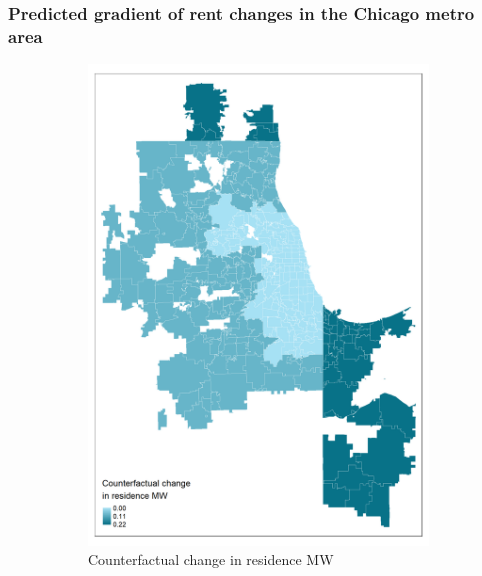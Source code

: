 \documentclass[aspectratio=169, t]{beamer}
\begin{document}
\begin{frame}
	\frametitle{Predicted gradient of rent changes in the Chicago metro area}
	\begin{figure}
		\centering
		\begin{subfigure}{0.33\textwidth}
			\includegraphics[width = 0.99\textwidth]{counterfactuals/output/chicago_d_ln_mw.png}
			\caption*{Counterfactual change in residence MW}
		\end{subfigure}%
		\begin{subfigure}{0.33\textwidth}

\end{subfigure}
\end{figure}
\end{frame}
\end{document}
